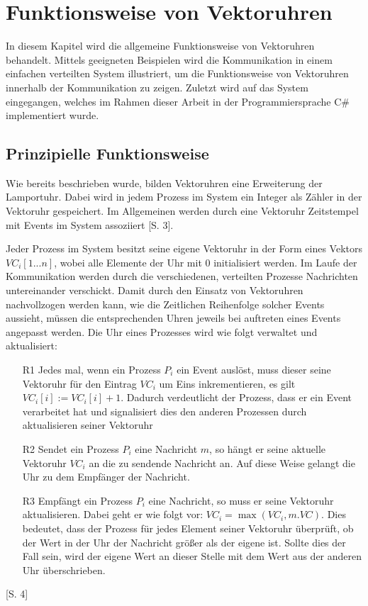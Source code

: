 \section{Funktionsweise von Vektoruhren}
\label{cap:funktionsweise}
In diesem Kapitel wird die allgemeine Funktionsweise von Vektoruhren behandelt. Mittels geeigneten Beispielen wird die Kommunikation in einem einfachen verteilten System illustriert, um die Funktionsweise von Vektoruhren innerhalb der Kommunikation zu zeigen. Zuletzt wird auf das System eingegangen, welches im Rahmen dieser Arbeit in der Programmiersprache C\# implementiert wurde.
\subsection{Prinzipielle Funktionsweise}
\label{prinzipFunktion}
Wie bereits beschrieben wurde, bilden Vektoruhren eine Erweiterung der Lamportuhr. Dabei wird in jedem Prozess im System ein Integer als Zähler in der Vektoruhr gespeichert. Im Allgemeinen werden durch eine Vektoruhr Zeitstempel mit Events im System assoziiert \cite{Baldoni:2002:FDC:1435723.1437765}[S. 3].

Jeder Prozess im System besitzt seine eigene Vektoruhr in der Form eines Vektors $VC_i[1...n]$, wobei alle Elemente der Uhr mit $0$ initialisiert werden. Im Laufe der Kommunikation werden durch die verschiedenen, verteilten Prozesse Nachrichten untereinander verschickt. Damit durch den Einsatz von Vektoruhren nachvollzogen werden kann, wie die Zeitlichen Reihenfolge solcher Events aussieht, müssen die entsprechenden Uhren jeweils bei auftreten eines Events angepasst werden.
Die Uhr eines Prozesses wird wie folgt verwaltet und aktualisiert:

\begin{itemize}
	\item[R1]Jedes mal, wenn ein Prozess $P_i$ ein Event auslöst, muss dieser seine Vektoruhr für den Eintrag $VC_i$ um Eins inkrementieren, es gilt  $VC_i[i] := VC_i[i] + 1$. Dadurch verdeutlicht der Prozess, dass er ein Event verarbeitet hat und signalisiert dies den anderen Prozessen durch aktualisieren seiner Vektoruhr 
	\item[R2]Sendet ein Prozess $P_i$ eine Nachricht $m$, so hängt er seine aktuelle Vektoruhr $VC_i$ an die zu sendende Nachricht an. Auf diese Weise gelangt die Uhr zu dem Empfänger der Nachricht.
	\item[R3]Empfängt ein Prozess $P_i$ eine Nachricht, so muss er seine Vektoruhr aktualisieren. Dabei geht er wie folgt vor: $VC_i = \max(VC_i, m.VC)$. Dies bedeutet, dass der Prozess für jedes Element seiner Vektoruhr überprüft, ob der Wert in der Uhr der Nachricht größer als der eigene ist. Sollte dies der Fall sein, wird der eigene Wert an dieser Stelle mit dem Wert aus der anderen Uhr überschrieben.\label{R3}
\end{itemize} \cite{Baldoni:2002:FDC:1435723.1437765}[S. 4]

